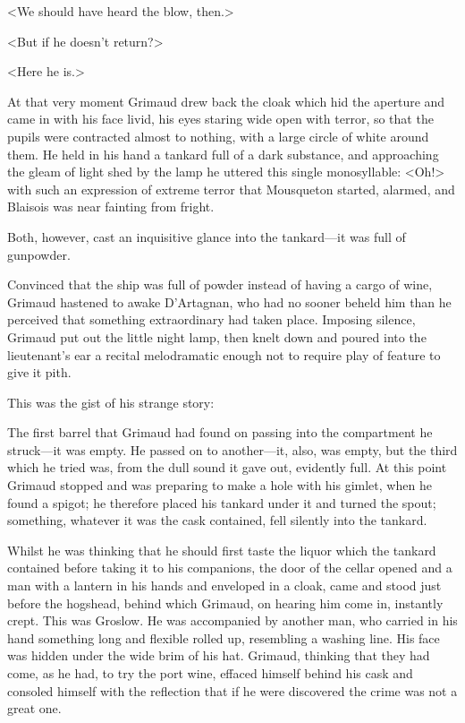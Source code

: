 <We should have heard the blow, then.>

<But if he doesn't return?>

<Here he is.>

At that very moment Grimaud drew back the cloak which hid the aperture and came in with his face livid, his eyes staring wide open with terror, so that the pupils were contracted almost to nothing, with a large circle of white around them. He held in his hand a tankard full of a dark substance, and approaching the gleam of light shed by the lamp he uttered this single monosyllable: <Oh!> with such an expression of extreme terror that Mousqueton started, alarmed, and Blaisois was near fainting from fright.

Both, however, cast an inquisitive glance into the tankard—it was full of gunpowder.

Convinced that the ship was full of powder instead of having a cargo of wine, Grimaud hastened to awake D'Artagnan, who had no sooner beheld him than he perceived that something extraordinary had taken place. Imposing silence, Grimaud put out the little night lamp, then knelt down and poured into the lieutenant's ear a recital melodramatic enough not to require play of feature to give it pith.

This was the gist of his strange story:

The first barrel that Grimaud had found on passing into the compartment he struck—it was empty. He passed on to another—it, also, was empty, but the third which he tried was, from the dull sound it gave out, evidently full. At this point Grimaud stopped and was preparing to make a hole with his gimlet, when he found a spigot; he therefore placed his tankard under it and turned the spout; something, whatever it was the cask contained, fell silently into the tankard.

Whilst he was thinking that he should first taste the liquor which the tankard contained before taking it to his companions, the door of the cellar opened and a man with a lantern in his hands and enveloped in a cloak, came and stood just before the hogshead, behind which Grimaud, on hearing him come in, instantly crept. This was Groslow. He was accompanied by another man, who carried in his hand something long and flexible rolled up, resembling a washing line. His face was hidden under the wide brim of his hat. Grimaud, thinking that they had come, as he had, to try the port wine, effaced himself behind his cask and consoled himself with the reflection that if he were discovered the crime was not a great one.

